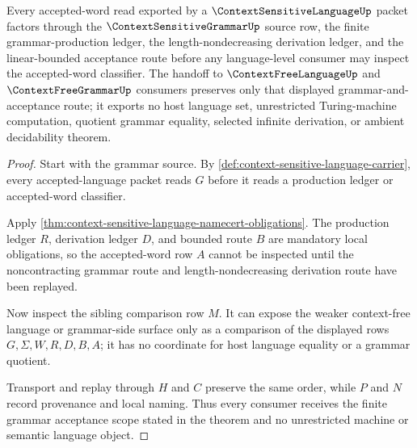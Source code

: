 \begin{theorem}
\label{thm:context-sensitive-language-grammar-acceptance-scope}
Every accepted-word read exported by a $\ContextSensitiveLanguageUp$ packet factors through the $\ContextSensitiveGrammarUp$ source row, the finite grammar-production ledger, the length-nondecreasing derivation ledger, and the linear-bounded acceptance route before any language-level consumer may inspect the accepted-word classifier. The handoff to $\ContextFreeLanguageUp$ and $\ContextFreeGrammarUp$ consumers preserves only that displayed grammar-and-acceptance route; it exports no host language set, unrestricted Turing-machine computation, quotient grammar equality, selected infinite derivation, or ambient decidability theorem.
\end{theorem}
\begin{proof}
Start with the grammar source. By \autoref{def:context-sensitive-language-carrier}, every accepted-language packet reads $G$ before it reads a production ledger or accepted-word classifier.

Apply \autoref{thm:context-sensitive-language-namecert-obligations}. The production ledger $R$, derivation ledger $D$, and bounded route $B$ are mandatory local obligations, so the accepted-word row $A$ cannot be inspected until the noncontracting grammar route and length-nondecreasing derivation route have been replayed.

Now inspect the sibling comparison row $M$. It can expose the weaker context-free language or grammar-side surface only as a comparison of the displayed rows $G,\Sigma,W,R,D,B,A$; it has no coordinate for host language equality or a grammar quotient.

Transport and replay through $H$ and $C$ preserve the same order, while $P$ and $N$ record provenance and local naming. Thus every consumer receives the finite grammar acceptance scope stated in the theorem and no unrestricted machine or semantic language object.
\end{proof}



